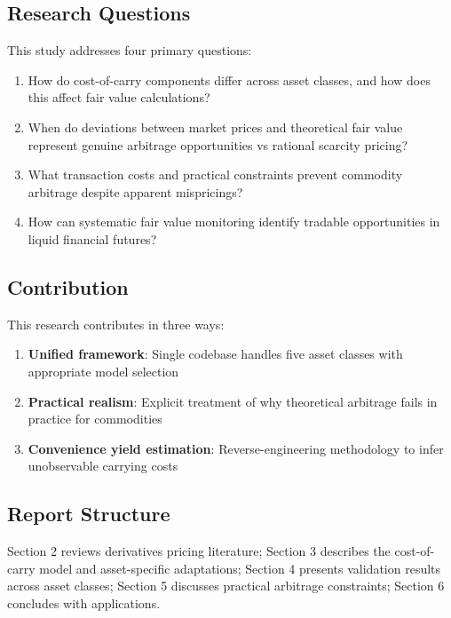 \documentclass[12pt,a4paper]{article}
\begin{document}
\subsection{Research Questions}

This study addresses four primary questions:

\begin{enumerate}
    \item How do cost-of-carry components differ across asset classes, and how does this affect fair value calculations?

    \item When do deviations between market prices and theoretical fair value represent genuine arbitrage opportunities vs rational scarcity pricing?

    \item What transaction costs and practical constraints prevent commodity arbitrage despite apparent mispricings?

    \item How can systematic fair value monitoring identify tradable opportunities in liquid financial futures?
\end{enumerate}

\subsection{Contribution}

This research contributes in three ways:

\begin{enumerate}
    \item \textbf{Unified framework}: Single codebase handles five asset classes with appropriate model selection

    \item \textbf{Practical realism}: Explicit treatment of why theoretical arbitrage fails in practice for commodities

    \item \textbf{Convenience yield estimation}: Reverse-engineering methodology to infer unobservable carrying costs
\end{enumerate}

\subsection{Report Structure}

Section 2 reviews derivatives pricing literature; Section 3 describes the cost-of-carry model and asset-specific adaptations; Section 4 presents validation results across asset classes; Section 5 discusses practical arbitrage constraints; Section 6 concludes with applications.
\end{document}
